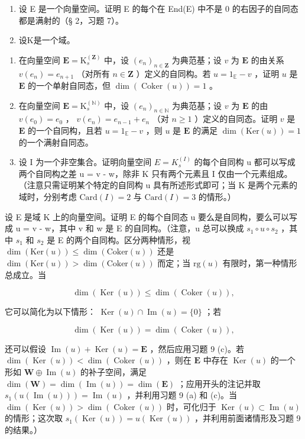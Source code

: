 \begin{enumerate}
\def\labelenumi{\arabic{enumi}.}
\setcounter{enumi}{7}
\item
  设 E 是一个向量空间。证明 E 的每个在 End(E) 中不是 0 的右因子的自同态都是满射的（§ 2，习题 7）。
\item
  设K是一个域。
\end{enumerate}

\begin{enumerate}
\def\labelenumi{(\alph{enumi})}
\item
  在向量空间 \(\mathbf{E} = \mathrm{K}_s^{(\mathbf{Z})}\) 中，设 \((e_n)_{n\in \mathbf{Z}}\) 为典范基；设 \(v\) 为 \(\mathbf{E}\) 的由关系 \(v(e_n) = e_{n + 1}\) （对所有 \(n\in \mathbf{Z}\) ）定义的自同构。若 \(u = 1_{\mathbb{E}} - v\) ，证明 \(u\) 是 \(\mathbf{E}\) 的一个单射自同态，但 \(\dim (\operatorname {Coker}(u)) = 1\) 。
\item
  在向量空间 \(\mathbf{E} = \mathrm{K}_s^{(\mathbb{N})}\) 中，设 \((e_n)_{n\in \mathbb{N}}\) 为典范基；设 \(v\) 为 \(\mathbf{E}\) 的由 \(v(e_0) = e_0\) ， \(v(e_n) = e_{n - 1} + e_n\) （对 \(n\geqslant 1\) ）定义的自同态。证明 \(v\) 是 \(\mathbf{E}\) 的一个自同构，且若 \(u = 1_{\mathbb{E}} - v\) ，则 \(u\) 是 \(\mathbf{E}\) 的满足 \(\dim (\mathrm{Ker}(u)) = 1\) 的一个满射自同态。
\item
  设 I 为一个非空集合。证明向量空间 \(E = K_{s}^{(I)}\) 的每个自同构 u 都可以写成两个自同构之差 u = v - w，除非 K 只有两个元素且 I 仅由一个元素组成。（注意只需证明某个特定的自同构 u 具有所述形式即可；当 K 是两个元素的域时，分别考虑 \(\text{Card}(I) = 2\) 与 \(\text{Card}(I) = 3\) 的情形。）
\end{enumerate}

设 E 是域 K 上的向量空间。证明 E 的每个自同态 u 要么是自同构，要么可以写成 u = v - w，其中 v 和 w 是 E 的自同构。（注意，u 总可以换成 \(s_{1} \circ u \circ s_{2}\) ，其中 \(s_{1}\) 和 \(s_{2}\) 是 E 的两个自同构。区分两种情形，视 \(\dim(\text{Ker}(u)) \leqslant \dim(\text{Coker}(u))\) 还是 \(\dim(\text{Ker}(u)) > \dim(\text{Coker}(u))\) 而定；当 \(\text{rg}(u)\) 有限时，第一种情形总成立。当

\[
\dim (\operatorname{Ker} (u)) \leqslant \dim (\operatorname{Coker} (u)),
\]

它可以简化为以下情形： \(\operatorname{Ker}(u) \cap \operatorname{Im}(u) = \{0\}\) ；若

\[
\dim (\operatorname{Ker} (u)) = \dim (\operatorname{Coker} (u)),
\]

还可以假设 \(\operatorname{Im}(u) + \operatorname{Ker}(u) = \mathbf{E}\) ，然后应用习题 9 (c)。若 \(\dim (\operatorname {Ker}(u)) < \dim (\operatorname {Coker}(u))\) ，则在 \(\mathbf{E}\) 中存在 \(\operatorname {Ker}(u)\) 的一个形如 \(\mathbf{W} \oplus \operatorname{Im}(u)\) 的补子空间，满足 \(\dim (\mathbf{W}) = \dim (\operatorname {Im}(u)) = \dim (\mathbf{E})\) ；应用开头的注记并取 \(s_1(u(\operatorname {Im}(u))) = \operatorname{Im}(u)\) ，并利用习题 9 (a) 和 (c)。当 \(\dim (\operatorname {Ker}(u)) > \dim (\operatorname {Coker}(u))\) 时，可化归于 \(\operatorname{Ker}(u) \subset \operatorname{Im}(u)\) 的情形；这次取 \(s_1(\operatorname{Ker}(u)) = u(\operatorname{Ker}(u))\) ，并利用前面诸情形及习题 9 的结果。）

